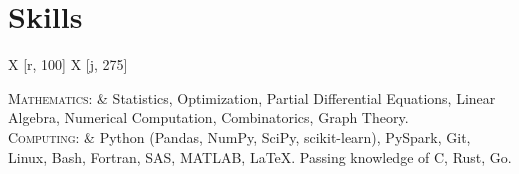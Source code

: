 \documentclass[letterpaper,11pt]{article} %
\newcommand\tabuwidth{\textwidth}  %
\newcommand\rcol{275}  %
\begin{document}

\section{Skills}

\begin{center}
\begin{tabu} to \tabuwidth {X [r, 100] X [j, \rcol]}

\textsc{Mathematics:} &
	Statistics,
	Optimization,
	Partial Differential Equations,
	Linear Algebra,
	Numerical Computation,
	Combinatorics,
	Graph Theory. \\
\textsc{Computing:} &
	Python (Pandas, NumPy, SciPy, scikit-learn),
	PySpark,
	Git,
	Linux,
	Bash,
	Fortran,
	SAS,
	MATLAB,
	\LaTeX.
	Passing knowledge of C, Rust, Go. \\

\end{tabu}
\end{center}
\end{document}

